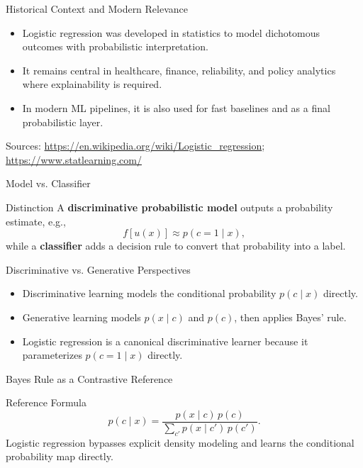 \documentclass[10pt]{beamer}
\begin{document}
\begin{frame}{Historical Context and Modern Relevance}
  \justifying
  \begin{itemize}
    \item Logistic regression was developed in statistics to model dichotomous outcomes with probabilistic interpretation.
    \item It remains central in healthcare, finance, reliability, and policy analytics where explainability is required.
    \item In modern ML pipelines, it is also used for fast baselines and as a final probabilistic layer.
  \end{itemize}
  \vspace{0.5em}
  {\footnotesize Sources: \url{https://en.wikipedia.org/wiki/Logistic_regression}; \url{https://www.statlearning.com/}}
\end{frame}

\begin{frame}{Model vs. Classifier}
  \justifying
  \begin{conceptbox}{Distinction}
    A \textbf{discriminative probabilistic model} outputs a probability estimate, e.g.,
    \[
      f[u(x)] \approx p(c=1 \mid x),
    \]
    while a \textbf{classifier} adds a decision rule to convert that probability into a label.
  \end{conceptbox}
\end{frame}

\begin{frame}{Discriminative vs. Generative Perspectives}
  \justifying
  \begin{itemize}
    \item Discriminative learning models the conditional probability $p(c\mid x)$ directly.
    \item Generative learning models $p(x\mid c)$ and $p(c)$, then applies Bayes' rule.
    \item Logistic regression is a canonical discriminative learner because it parameterizes $p(c=1\mid x)$ directly.
  \end{itemize}
\end{frame}

\begin{frame}{Bayes Rule as a Contrastive Reference}
  \justifying
  \begin{conceptbox}{Reference Formula}
    \[
      p(c \mid x) = \frac{p(x \mid c)\,p(c)}{\sum_{c'} p(x \mid c')\,p(c')}.
    \]
    Logistic regression bypasses explicit density modeling and learns the conditional probability map directly.
  \end{conceptbox}
\end{frame}
\end{document}

